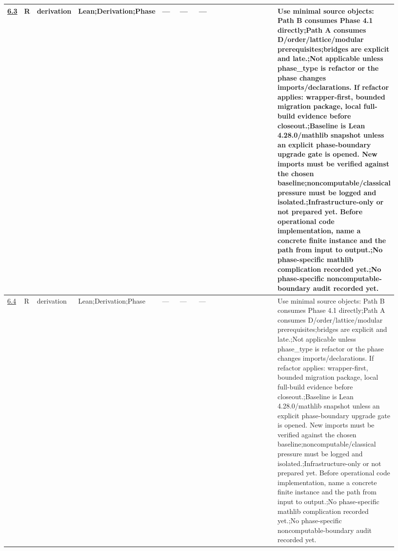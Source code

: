 \begin{longtable}{L{0.026\linewidth} L{0.024\linewidth} L{0.045\linewidth} L{0.07\linewidth} L{0.065\linewidth} L{0.075\linewidth} L{0.11\linewidth} L{0.19\linewidth} L{0.155\linewidth} L{0.17\linewidth}}
\hline
\addlinespace[0.24em]
\hyperlink{phase-row-6-3}{6.3} & R & derivation & Lean;\newline Derivation;\newline Phase & --- & --- & --- &  &  & Use minimal source objects: Path B consumes Phase 4.1 directly;\newline Path A consumes D/\allowbreak{}order/\allowbreak{}lattice/\allowbreak{}modular prerequisites;\newline bridges are explicit and late.;\newline Not applicable unless phase\_type is refactor or the phase changes imports/\allowbreak{}declarations. If refactor applies: wrapper-first, bounded migration package, local full-build evidence before closeout.;\newline Baseline is Lean 4.28.0/\allowbreak{}mathlib snapshot unless an explicit phase-boundary upgrade gate is opened. New imports must be verified against the chosen baseline;\newline noncomputable/\allowbreak{}classical pressure must be logged and isolated.;\newline Infrastructure-only or not prepared yet. Before operational code implementation, name a concrete finite instance and the path from input to output.;\newline No phase-specific mathlib complication recorded yet.;\newline No phase-specific noncomputable-boundary audit recorded yet.\\
\hline
\addlinespace[0.24em]
\hyperlink{phase-row-6-4}{6.4} & R & derivation & Lean;\newline Derivation;\newline Phase & --- & --- & --- &  &  & Use minimal source objects: Path B consumes Phase 4.1 directly;\newline Path A consumes D/\allowbreak{}order/\allowbreak{}lattice/\allowbreak{}modular prerequisites;\newline bridges are explicit and late.;\newline Not applicable unless phase\_type is refactor or the phase changes imports/\allowbreak{}declarations. If refactor applies: wrapper-first, bounded migration package, local full-build evidence before closeout.;\newline Baseline is Lean 4.28.0/\allowbreak{}mathlib snapshot unless an explicit phase-boundary upgrade gate is opened. New imports must be verified against the chosen baseline;\newline noncomputable/\allowbreak{}classical pressure must be logged and isolated.;\newline Infrastructure-only or not prepared yet. Before operational code implementation, name a concrete finite instance and the path from input to output.;\newline No phase-specific mathlib complication recorded yet.;\newline No phase-specific noncomputable-boundary audit recorded yet.\\

\end{longtable}
